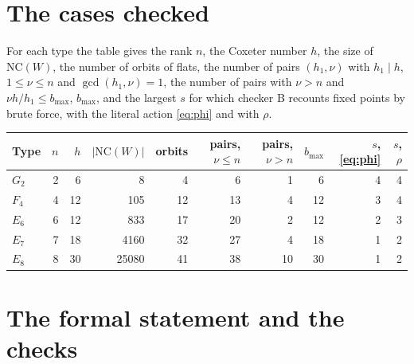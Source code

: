 \documentclass[11pt]{article}
\theoremstyle{definition}
\newcommand{\NC}{\mathrm{NC}}
\begin{document}
\begin{appendices}
\section{The cases checked}\label{app:cases}

For each type the table gives the rank $n$, the Coxeter number $h$, the size
of $\NC(W)$, the number of orbits of flats, the number of pairs
$(h_1,\nu)$ with $h_1\mid h$, $1\le \nu\le n$ and $\gcd(h_1,\nu)=1$, the
number of pairs with $\nu>n$ and $\nu h/h_1\le b_{\max}$, $b_{\max}$, and the
largest $s$ for which checker B recounts fixed points by brute force, with
the literal action \eqref{eq:phi} and with $\rho$.

\begin{center}
\begin{tabular}{lrrrrrrrrr}
\toprule
Type & $n$ & $h$ & $|\NC(W)|$ & orbits & pairs, $\nu\le n$ & pairs, $\nu>n$ & $b_{\max}$ & $s$, \eqref{eq:phi} & $s$, $\rho$\\
\midrule
$G_2$ & 2 & 6 & 8 & 4 & 6 & 1 & 6 & 4 & 4\\
$F_4$ & 4 & 12 & 105 & 12 & 13 & 4 & 12 & 3 & 4\\
$E_6$ & 6 & 12 & 833 & 17 & 20 & 2 & 12 & 2 & 3\\
$E_7$ & 7 & 18 & 4160 & 32 & 27 & 4 & 18 & 1 & 2\\
$E_8$ & 8 & 30 & 25080 & 41 & 38 & 10 & 30 & 1 & 2\\
\bottomrule
\end{tabular}
\end{center}

\section{The formal statement and the checks}\label{app:lean}


\end{appendices}
\end{document}
